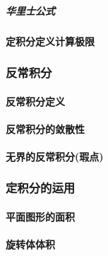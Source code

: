 \documentclass[
]{article}
\begin{document}
\hypertarget{ux534eux91ccux58ebux516cux5f0f}{%
\subparagraph{华里士公式}\label{ux534eux91ccux58ebux516cux5f0f}}

\hypertarget{ux5b9aux79efux5206ux5b9aux4e49ux8ba1ux7b97ux6781ux9650}{%
\paragraph{定积分定义计算极限}\label{ux5b9aux79efux5206ux5b9aux4e49ux8ba1ux7b97ux6781ux9650}}

\hypertarget{ux53cdux5e38ux79efux5206}{%
\subsubsection{反常积分}\label{ux53cdux5e38ux79efux5206}}

\hypertarget{ux53cdux5e38ux79efux5206ux5b9aux4e49}{%
\paragraph{反常积分定义}\label{ux53cdux5e38ux79efux5206ux5b9aux4e49}}

\hypertarget{ux53cdux5e38ux79efux5206ux7684ux655bux6563ux6027}{%
\paragraph{反常积分的敛散性}\label{ux53cdux5e38ux79efux5206ux7684ux655bux6563ux6027}}

\hypertarget{ux65e0ux754cux7684ux53cdux5e38ux79efux5206ux7455ux70b9}{%
\paragraph{无界的反常积分(瑕点)}\label{ux65e0ux754cux7684ux53cdux5e38ux79efux5206ux7455ux70b9}}

\hypertarget{ux5b9aux79efux5206ux7684ux8fd0ux7528}{%
\subsubsection{定积分的运用}\label{ux5b9aux79efux5206ux7684ux8fd0ux7528}}

\hypertarget{ux5e73ux9762ux56feux5f62ux7684ux9762ux79ef}{%
\paragraph{平面图形的面积}\label{ux5e73ux9762ux56feux5f62ux7684ux9762ux79ef}}

\hypertarget{ux65cbux8f6cux4f53ux4f53ux79ef}{%
\paragraph{旋转体体积}\label{ux65cbux8f6cux4f53ux4f53ux79ef}}
\end{document}
